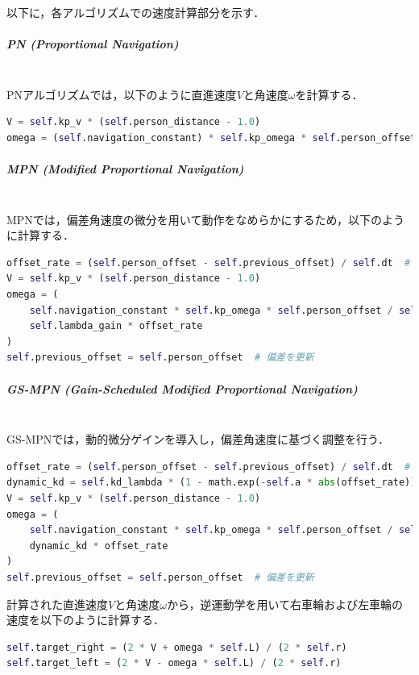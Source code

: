 以下に，各アルゴリズムでの速度計算部分を示す．

\subparagraph{PN (Proportional Navigation)}\mbox{}\\
PNアルゴリズムでは，以下のように直進速度$V$と角速度$\omega$を計算する．
\begin{lstlisting}[language=Python, caption=PNの計算部分 (Roboware\_node\_np.py)]
V = self.kp_v * (self.person_distance - 1.0)
omega = (self.navigation_constant) * self.kp_omega * self.person_offset / max((self.person_distance), 1.0)
\end{lstlisting}

\subparagraph{MPN (Modified Proportional Navigation)}\mbox{}\\
MPNでは，偏差角速度の微分を用いて動作をなめらかにするため，以下のように計算する．
\begin{lstlisting}[language=Python, caption=MPNの計算部分 (Roboware\_node\_mpn.py)]
offset_rate = (self.person_offset - self.previous_offset) / self.dt  # 偏差角速度
V = self.kp_v * (self.person_distance - 1.0)
omega = (
    self.navigation_constant * self.kp_omega * self.person_offset / self.person_distance +
    self.lambda_gain * offset_rate
)
self.previous_offset = self.person_offset  # 偏差を更新
\end{lstlisting}

\subparagraph{GS-MPN (Gain-Scheduled Modified Proportional Navigation)}\mbox{}\\
GS-MPNでは，動的微分ゲインを導入し，偏差角速度に基づく調整を行う．
\begin{lstlisting}[language=Python, caption=GS-MPNの計算部分 (Roboware\_node\_newmpn.py)]
offset_rate = (self.person_offset - self.previous_offset) / self.dt  # 偏差角速度
dynamic_kd = self.kd_lambda * (1 - math.exp(-self.a * abs(offset_rate))) / (1 + math.exp(-self.a * abs(offset_rate)))
V = self.kp_v * (self.person_distance - 1.0)
omega = (
    self.navigation_constant * self.kp_omega * self.person_offset / self.person_distance +
    dynamic_kd * offset_rate
)
self.previous_offset = self.person_offset  # 偏差を更新
\end{lstlisting}



計算された直進速度$V$と角速度$\omega$から，逆運動学を用いて右車輪および左車輪の速度を以下のように計算する．
\begin{lstlisting}[language=Python, caption=逆運動学を用いた車輪速度の計算]
self.target_right = (2 * V + omega * self.L) / (2 * self.r)
self.target_left = (2 * V - omega * self.L) / (2 * self.r)
\end{lstlisting}

